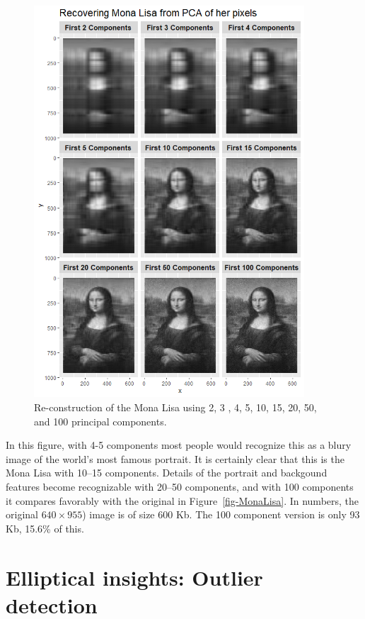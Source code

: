 \documentclass[
  letterpaper,
  10pt,
  krantz2]{krantz}
\begin{document}
{\begin{figure}
{\includegraphics[width=0.9\textwidth,height=\textheight]{images/mona-pca.png}

}

\caption{\label{fig-mona-pca}Re-construction of the Mona Lisa using 2, 3
, 4, 5, 10, 15, 20, 50, and 100 principal components.}

\end{figure}%

In this figure, with 4-5 components most people would recognize this as
a blury image of the world's most famous portrait. It is certainly clear
that this is the Mona Lisa with 10--15 components. Details of the
portrait and backgound features become recognizable with 20--50
components, and with 100 components it compares favorably with the
original in Figure~\ref{fig-MonaLisa}. In numbers, the original
\(640 \times 955\)) image is of size 600 Kb. The 100 component version
is only 93 Kb, 15.6\% of this.

\section{Elliptical insights: Outlier
detection}\label{elliptical-insights-outlier-detection}

}
\end{document}
